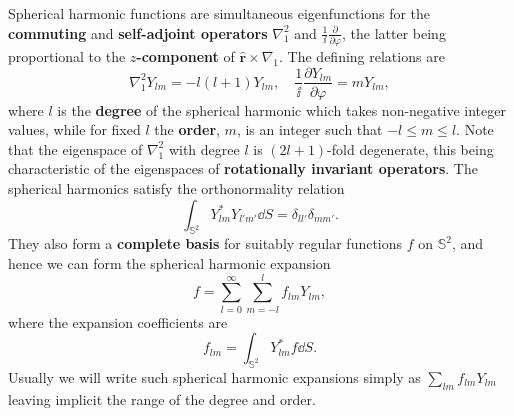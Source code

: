 Spherical harmonic functions are simultaneous eigenfunctions for the 
 \textbf{commuting} and \textbf{self-adjoint operators} $\nabla_{1}^{2}$ and $\frac{1}{\ii}\frac{\partial}{\partial\varphi}$, the latter being proportional to the \textbf{$z$-component}
  of $\hat{\mathbf{r}}\times\nabla_{1}$. The defining relations are
\begin{equation}\label{eq:3}
\nabla_{1}^{2}Y_{lm}=-l(l+1)Y_{lm}, \quad \frac{1}{\ii}\frac{\partial Y_{lm}}{\partial\varphi}=mY_{lm},
\end{equation}
where $l$ is the \textbf{degree} of the spherical harmonic which takes non-negative integer values, while for fixed $l$ the \textbf{order}, $m$, 
is an integer such that $-l\le m\le l$. Note that the eigenspace of $\nabla_{1}^{2}$ with degree $l$ is $(2l+1)$-fold degenerate, 
this being characteristic of the eigenspaces of \textbf{rotationally invariant operators}. The spherical harmonics satisfy the orthonormality relation
\begin{equation}\label{eq:4}
\int_{\mathbb{S}^{2}}Y_{lm}^{*}Y_{l'm'}\dd S=\delta_{ll'}\delta_{mm'}.
\end{equation}
They also form a \textbf{complete basis} for suitably regular functions $f$ on $\mathbb{S}^{2}$, and hence we
 can form the spherical harmonic expansion
\begin{equation}\label{eq:5}
f=\sum_{l=0}^{\infty}\sum_{m=-l}^{l}f_{lm}Y_{lm},
\end{equation}
where the expansion coefficients are
\begin{equation}\label{eq:6}
f_{lm}=\int_{\mathbb{S}^{2}}Y_{lm}^{*}f\dd S.
\end{equation}
Usually we will write such spherical harmonic expansions simply as $\sum_{lm}f_{lm}Y_{lm}$ leaving implicit the range of the degree and order. 


